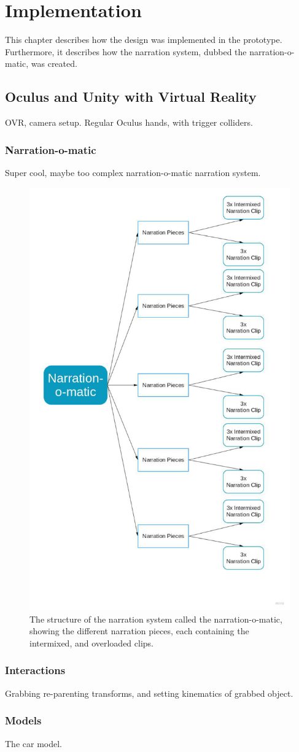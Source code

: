 \chapter{Implementation}
This chapter describes how the design was implemented in the prototype. Furthermore, it describes how the narration system, dubbed the narration-o-matic, was created.

\section{Oculus and Unity with Virtual Reality}
    OVR, camera setup. Regular Oculus hands, with trigger colliders.
\subsection{Narration-o-matic}
    Super cool, maybe too complex narration-o-matic narration system.
    
    \begin{figure}[H]
        \centering
        \includegraphics[width=0.6\linewidth]{figure/Implementation/Narration-o-matic-flowchart}
        \caption{The structure of the narration system called the narration-o-matic, showing the different narration pieces, each containing the intermixed, and overloaded clips.}
        \label{fig:narration-o-matic}
    \end{figure}
\subsection{Interactions}
    Grabbing re-parenting transforms, and setting kinematics of grabbed object.

\subsection{Models}
    The car model.

